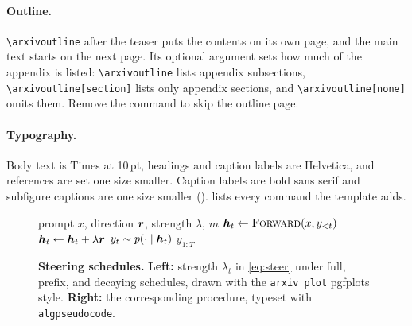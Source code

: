 \documentclass[11pt]{article}
\begin{document}
\paragraph{Outline.} \texttt{\textbackslash arxivoutline} after the teaser puts the contents on its own page, and the main text starts on the next page. Its optional argument sets how much of the appendix is listed: \texttt{\textbackslash arxivoutline} lists appendix subsections, \texttt{\textbackslash arxivoutline[section]} lists only appendix sections, and \texttt{\textbackslash arxivoutline[none]} omits them. Remove the command to skip the outline page.

\paragraph{Typography.} Body text is Times at 10\,pt, headings and caption labels are Helvetica, and references are set one size smaller. Caption labels are bold sans serif and subfigure captions are one size smaller ().  lists every command the template adds.

\begin{figure}[t]
\centering
\begin{minipage}[c]{0.48\linewidth}
\centering
{}
\end{minipage}\hfill
\begin{minipage}[c]{0.48\linewidth}
\begin{algorithm}[H]
\caption{Prefix steering}
\label{alg:prefix}
\begin{algorithmic}[1]
\Require prompt $x$, direction $\boldsymbol{r}$, strength $\lambda$, $m$
  \State $\boldsymbol{h}_t \gets \textsc{Forward}(x, y_{<t})$
    \State $\boldsymbol{h}_t \gets \boldsymbol{h}_t + \lambda \boldsymbol{r}$
  \EndIf
  \State $y_t \sim p(\cdot \mid \boldsymbol{h}_t)$
\EndFor
\State \Return $y_{1:T}$
\end{algorithmic}
\end{algorithm}
\end{minipage}
\caption{\textbf{Steering schedules.} \textbf{Left:} strength $\lambda_t$ in \cref{eq:steer} under full, prefix, and decaying schedules, drawn with the \texttt{arxiv plot} pgfplots style. \textbf{Right:} the corresponding procedure, typeset with \texttt{algpseudocode}.}
\label{fig:schedules}
\end{figure}
\end{document}

